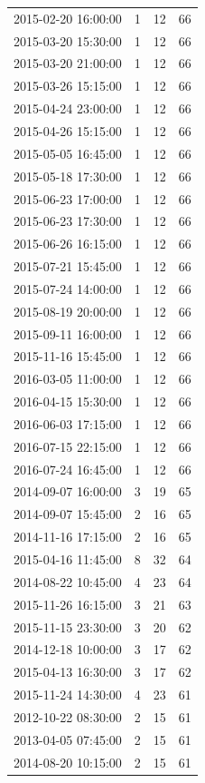 \begin{tabular}{lrrr}
2015-02-20 16:00:00 & 1 & 12 & 66 \\
2015-03-20 15:30:00 & 1 & 12 & 66 \\
2015-03-20 21:00:00 & 1 & 12 & 66 \\
2015-03-26 15:15:00 & 1 & 12 & 66 \\
2015-04-24 23:00:00 & 1 & 12 & 66 \\
2015-04-26 15:15:00 & 1 & 12 & 66 \\
2015-05-05 16:45:00 & 1 & 12 & 66 \\
2015-05-18 17:30:00 & 1 & 12 & 66 \\
2015-06-23 17:00:00 & 1 & 12 & 66 \\
2015-06-23 17:30:00 & 1 & 12 & 66 \\
2015-06-26 16:15:00 & 1 & 12 & 66 \\
2015-07-21 15:45:00 & 1 & 12 & 66 \\
2015-07-24 14:00:00 & 1 & 12 & 66 \\
2015-08-19 20:00:00 & 1 & 12 & 66 \\
2015-09-11 16:00:00 & 1 & 12 & 66 \\
2015-11-16 15:45:00 & 1 & 12 & 66 \\
2016-03-05 11:00:00 & 1 & 12 & 66 \\
2016-04-15 15:30:00 & 1 & 12 & 66 \\
2016-06-03 17:15:00 & 1 & 12 & 66 \\
2016-07-15 22:15:00 & 1 & 12 & 66 \\
2016-07-24 16:45:00 & 1 & 12 & 66 \\
2014-09-07 16:00:00 & 3 & 19 & 65 \\
2014-09-07 15:45:00 & 2 & 16 & 65 \\
2014-11-16 17:15:00 & 2 & 16 & 65 \\
2015-04-16 11:45:00 & 8 & 32 & 64 \\
2014-08-22 10:45:00 & 4 & 23 & 64 \\
2015-11-26 16:15:00 & 3 & 21 & 63 \\
2015-11-15 23:30:00 & 3 & 20 & 62 \\
2014-12-18 10:00:00 & 3 & 17 & 62 \\
2015-04-13 16:30:00 & 3 & 17 & 62 \\
2015-11-24 14:30:00 & 4 & 23 & 61 \\
2012-10-22 08:30:00 & 2 & 15 & 61 \\
2013-04-05 07:45:00 & 2 & 15 & 61 \\
2014-08-20 10:15:00 & 2 & 15 & 61 \\

\end{tabular}
